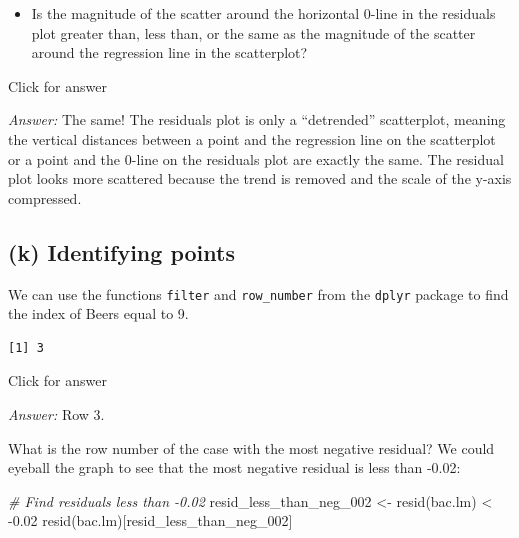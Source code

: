 \documentclass[
]{book}
\newenvironment{Shaded}{\begin{snugshade}}{\end{snugshade}}
\newcommand{\CommentTok}[1]{\textcolor[rgb]{0.56,0.35,0.01}{\textit{#1}}}
\newcommand{\DecValTok}[1]{\textcolor[rgb]{0.00,0.00,0.81}{#1}}
\newcommand{\FloatTok}[1]{\textcolor[rgb]{0.00,0.00,0.81}{#1}}
\newcommand{\FunctionTok}[1]{\textcolor[rgb]{0.00,0.00,0.00}{#1}}
\newcommand{\NormalTok}[1]{#1}
\newcommand{\OtherTok}[1]{\textcolor[rgb]{0.56,0.35,0.01}{#1}}
\newcommand{\SpecialCharTok}[1]{\textcolor[rgb]{0.00,0.00,0.00}{#1}}
\providecommand{\tightlist}{%
  \setlength{\itemsep}{0pt}\setlength{\parskip}{0pt}}
\begin{document}
\begin{itemize}
\tightlist
\item
  Is the magnitude of the scatter around the horizontal 0-line in the residuals plot greater than, less than, or the same as the magnitude of the scatter around the regression line in the scatterplot?
\end{itemize}

Click for answer

\emph{Answer:} The same! The residuals plot is only a ``detrended'' scatterplot, meaning the vertical distances between a point and the regression line on the scatterplot or a point and the 0-line on the residuals plot are exactly the same. The residual plot looks more scattered because the trend is removed and the scale of the y-axis compressed.

\hypertarget{k-identifying-points}{%
\subsection{(k) Identifying points}\label{k-identifying-points}}

We can use the functions \texttt{filter} and \texttt{row\_number} from the \texttt{dplyr} package to find the index of Beers equal to 9.

\begin{Shaded}
\end{Shaded}

\begin{verbatim}
[1] 3
\end{verbatim}

Click for answer

\emph{Answer:} Row 3.

What is the row number of the case with the most negative residual? We could eyeball the graph to see that the most negative residual is less than -0.02:

\begin{Shaded}
\begin{Highlighting}[]
\CommentTok{\# Find residuals less than {-}0.02}
\NormalTok{resid\_less\_than\_neg\_002 }\OtherTok{\textless{}{-}} \FunctionTok{resid}\NormalTok{(bac.lm) }\SpecialCharTok{\textless{}} \SpecialCharTok{{-}}\FloatTok{0.02}
\FunctionTok{resid}\NormalTok{(bac.lm)[resid\_less\_than\_neg\_002]}
\end{Highlighting}
\end{Shaded}
\end{document}
